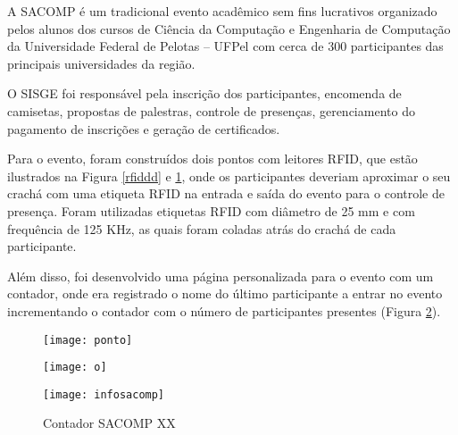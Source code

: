 \documentclass[tcc,capa]{texufpel}
\begin{document}
            A SACOMP é um tradicional evento acadêmico sem fins lucrativos organizado pelos alunos dos cursos de Ciência da Computação e Engenharia de Computação da Universidade Federal de Pelotas – UFPel com cerca de 300 participantes das principais universidades da região.
            
            O SISGE foi responsável pela inscrição dos participantes, encomenda de camisetas, propostas de palestras, controle de presenças, gerenciamento do pagamento de inscrições e geração de certificados.
            
            Para o evento, foram construídos dois pontos com leitores RFID, que estão ilustrados na Figura  \ref{rfiddd} e  \ref{aprox}, onde os participantes deveriam aproximar o seu crachá com uma etiqueta RFID na entrada e saída do evento para o controle de presença.
            Foram utilizadas etiquetas RFID com diâmetro de 25 mm e com frequência de 125 KHz, as quais foram coladas atrás do crachá de cada participante. 
            
            Além disso, foi desenvolvido uma página personalizada para o evento com um contador, onde era registrado o nome do último participante a entrar no evento incrementando o contador com o número de participantes presentes (Figura  \ref{contador}). 
            
            \begin{figure}[H]
            \centering
                \begin{minipage}{.36\linewidth}
                  \texttt{[image: ponto]}
                  \label{rfiddd}
                \end{minipage}
                \hspace{.05\linewidth}
                \begin{minipage}{.36\linewidth}
                  \texttt{[image: o]}
                  \label{aprox}
                \end{minipage}
            \end{figure}
            
            \begin{figure}[H]
                \centering \texttt{[image: infosacomp]}
                \caption{Contador SACOMP XX} 
                \label{contador}
            \end{figure}
            
\end{document}
